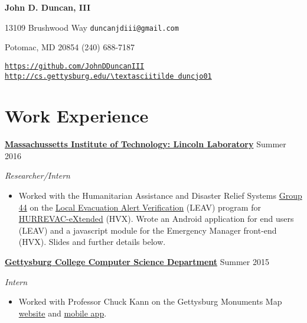 \documentclass[11pt]{article}
\begin{document}
    \fancyfoot{}
    \pagestyle{fancy}
    \thispagestyle{empty}
    \renewcommand{\headrulewidth}{0pt}
\begin{center}
{\huge \textbf{John D. Duncan, III}}
\end{center}
13109 Brushwood Way
\hfill
\texttt{duncanjdiii@gmail.com}

Potomac, MD 20854
\hfill
(240) 688-7187

\texttt{\url{https://github.com/JohnDDuncanIII}}
\hfill
\texttt{\url{http://cs.gettysburg.edu/\textasciitilde duncjo01}}

\section*{Work Experience}
\textbf{\href{http://www.ll.mit.edu/}{Massachussetts Institute of Technology: Lincoln Laboratory}}
\hfill
Summer 2016

\textit{Researcher/Intern}

\begin{itemize}
\item Worked with the Humanitarian Assistance and Disaster Relief Systems \href{https://www.ll.mit.edu/employment/division4.html#gp44}{Group 44} on the \href{https://www.dhs.gov/publication/national-hurricane-program-technology-modernization-local-evacuation-alert-verification}{Local Evacuation Alert Verification} (LEAV) program for \href{https://www.dhs.gov/publication/national-hurricane-program-technology-modernization-hurrevac-extended-hv-x}{HURREVAC-eXtended} (HVX). Wrote an Android application for end users (LEAV) and a javascript module for the Emergency Manager front-end (HVX). Slides and further details below.\\
\end{itemize}

\textbf{\href{http://cs.gettysburg.edu/}{Gettysburg College Computer Science Department}}
\hfill
Summer 2015

\textit{Intern}

\begin{itemize}
\item Worked with Professor Chuck Kann on the Gettysburg Monuments Map \href{http://historicgettysburg.us/MonumentsMap/Monuments.html}{website} and \href{https://play.google.com/store/apps/details?id=edu.gettysburg.MonumentsMap}{mobile app}.\\
\end{itemize}
\end{document}
